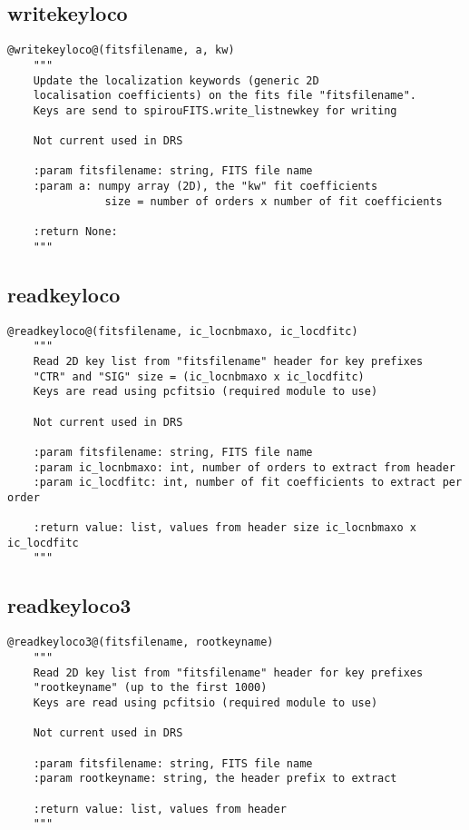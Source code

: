 \vspace{0.5cm}
\subsection{writekeyloco}
\begin{lstlisting}[style=pythonstyle]
@writekeyloco@(fitsfilename, a, kw)
    """
    Update the localization keywords (generic 2D 
    localisation coefficients) on the fits file "fitsfilename".
    Keys are send to spirouFITS.write_listnewkey for writing

    Not current used in DRS

    :param fitsfilename: string, FITS file name
    :param a: numpy array (2D), the "kw" fit coefficients
               size = number of orders x number of fit coefficients

    :return None:
    """
\end{lstlisting}

\vspace{0.5cm}
\subsection{readkeyloco}
\begin{lstlisting}[style=pythonstyle]
@readkeyloco@(fitsfilename, ic_locnbmaxo, ic_locdfitc)
    """
    Read 2D key list from "fitsfilename" header for key prefixes
    "CTR" and "SIG" size = (ic_locnbmaxo x ic_locdfitc)
    Keys are read using pcfitsio (required module to use)
    
    Not current used in DRS
    
    :param fitsfilename: string, FITS file name
    :param ic_locnbmaxo: int, number of orders to extract from header
    :param ic_locdfitc: int, number of fit coefficients to extract per order
    
    :return value: list, values from header size ic_locnbmaxo x ic_locdfitc
    """
\end{lstlisting}

\vspace{0.5cm}
\subsection{readkeyloco3}
\begin{lstlisting}[style=pythonstyle]
@readkeyloco3@(fitsfilename, rootkeyname)
    """
    Read 2D key list from "fitsfilename" header for key prefixes
    "rootkeyname" (up to the first 1000)
    Keys are read using pcfitsio (required module to use)

    Not current used in DRS

    :param fitsfilename: string, FITS file name
    :param rootkeyname: string, the header prefix to extract

    :return value: list, values from header
    """
\end{lstlisting}

